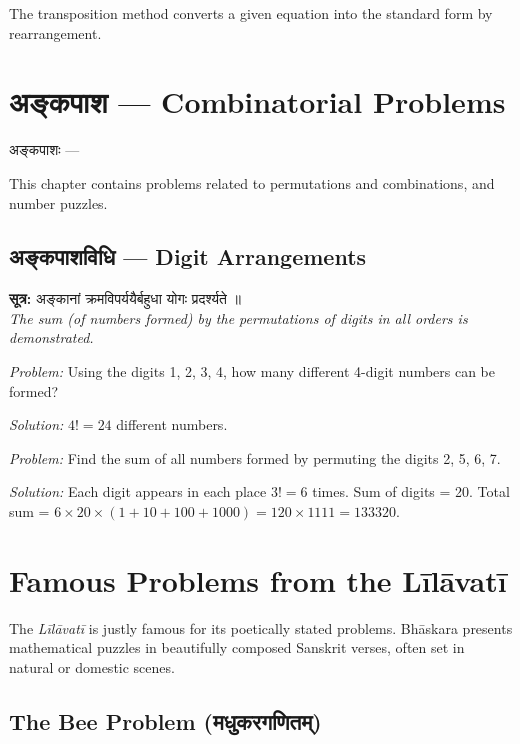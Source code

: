 \documentclass[10pt,a4paper]{article}
\newenvironment{sanskritverse}{%
  \begin{center}%
  \begin{minipage}{0.94\textwidth}%
  \centering\devanagarifont\small%
}{%
  \end{minipage}%
  \end{center}%
  \vspace{0.1em}%
}
\begin{document}
The transposition method converts a given equation into the standard form by rearrangement.

\section{अङ्कपाश — Combinatorial Problems}
\label{sec:ankapasha}

\begin{sanskritverse}
अङ्कपाशः ---
\end{sanskritverse}

This chapter contains problems related to permutations and combinations, and number puzzles.

\subsection{अङ्कपाशविधि — Digit Arrangements}

\begin{sanskritverse}
\textbf{सूत्र:} अङ्कानां क्रमविपर्ययैर्बहुधा योगः प्रदर्श्यते ॥\\
\textit{The sum (of numbers formed) by the permutations of digits in all orders is demonstrated.}
\end{sanskritverse}

\textit{Problem:} Using the digits 1, 2, 3, 4, how many different 4-digit numbers can be formed?

\textit{Solution:} $4! = 24$ different numbers.

\textit{Problem:} Find the sum of all numbers formed by permuting the digits 2, 5, 6, 7.

\textit{Solution:} Each digit appears in each place $3! = 6$ times. Sum of digits = 20.
Total sum = $6 \times 20 \times (1 + 10 + 100 + 1000) = 120 \times 1111 = 133320$.

\section*{Famous Problems from the Līlāvatī}

The \textit{Līlāvatī} is justly famous for its poetically stated problems. Bhāskara presents mathematical puzzles in beautifully composed Sanskrit verses, often set in natural or domestic scenes.

\subsection*{The Bee Problem (मधुकरगणितम्)}
\end{document}
